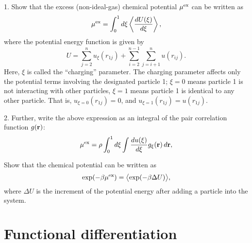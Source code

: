 \documentclass{book}
\begin{document}



1. Show that the excess (non-ideal-gas) chemical potential ${ { \mu }^{ \mathrm{ex} } }$ can be written as
\begin{equation}
  { { \mu }^{ \mathrm{ex} } }
=
  \int_0^1 d\xi \left\langle \frac{d U(\xi)}{d\xi} \right\rangle,
  \label{eq:muti}
\end{equation}
%
where the potential energy function is given by
\[
  U =
  \sum_{j = 2}^n u_\xi(r_{1j})
  +
  \sum_{i = 2}^{n - 1} \sum_{j = i+1}^n u(r_{ij}).
\]
%
Here, $\xi$ is called the ``charging'' parameter.
%
The charging parameter affects only the potential terms involving
the designated particle 1;
$\xi = 0$ means particle 1 is not interacting with other particles,
$\xi = 1$ means particle 1 is identical to any other particle.
%
That is,
$u_{\xi = 0}(r_{1j}) = 0$,
and
$u_{\xi = 1}(r_{1j}) = u(r_{1j})$.

2. Further, write the above expression as an integral of
the pair correlation function $g(\boldsymbol{\mathbf{r}})$:
\begin{equation}
  { { \mu }^{ \mathrm{ex} } }
=
  \rho \int_0^1 d\xi \int \frac{d u(\xi)}{d\xi} g_\xi(\boldsymbol{\mathbf{r}}) \, d\boldsymbol{\mathbf{r}},
  \label{eq:mutigr}
\end{equation}




Show that the chemical potential can be written as
\begin{equation}
  \exp(-\beta { { \mu }^{ \mathrm{ex} } })
=
  \bigl\langle
    \exp( -\beta \Delta U )
  \bigr\rangle,
\end{equation}
%
where $\Delta U$ is the increment of the potential energy
after adding a particle into the system.



\chapter{Functional differentiation}


%
%
\end{document}
